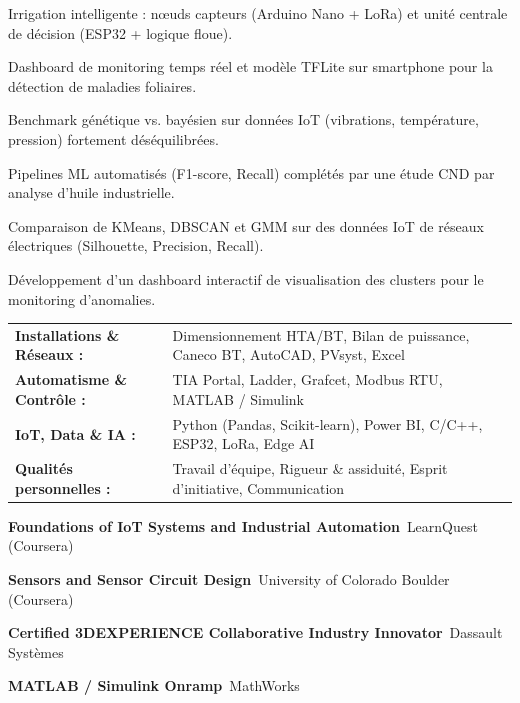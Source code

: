 \documentclass[10pt,a4paper]{../altacv}
\begin{document}
\begin{cvitems}
  \item Irrigation intelligente : nœuds capteurs (Arduino Nano + LoRa) et unité centrale de décision (ESP32 + logique floue).
  \item Dashboard de monitoring temps réel et modèle TFLite sur smartphone pour la détection de maladies foliaires.
\end{cvitems}
\vspace{2pt}
\begin{cvitems}
  \item Benchmark génétique vs. bayésien sur données IoT (vibrations, température, pression) fortement déséquilibrées.
  \item Pipelines ML automatisés (F1-score, Recall) complétés par une étude CND par analyse d’huile industrielle.
\end{cvitems}
\vspace{2pt}
\begin{cvitems}
  \item Comparaison de KMeans, DBSCAN et GMM sur des données IoT de réseaux électriques (Silhouette, Precision, Recall).
  \item Développement d’un dashboard interactif de visualisation des clusters pour le monitoring d’anomalies.
\end{cvitems}

{\small
\begin{tabular}{@{}ll@{}}
\textbf{Installations \& Réseaux :} & Dimensionnement HTA/BT, Bilan de puissance, Caneco BT, AutoCAD, PVsyst, Excel \\[1.5pt]
\textbf{Automatisme \& Contrôle :} & TIA Portal, Ladder, Grafcet, Modbus RTU, MATLAB / Simulink \\[1.5pt]
\textbf{IoT, Data \& IA :} & Python (Pandas, Scikit-learn), Power BI, C/C++, ESP32, LoRa, Edge AI \\[1.5pt]
\textbf{Qualités personnelles :} & Travail d’équipe, Rigueur \& assiduité, Esprit d’initiative, Communication
\end{tabular}
}

\begin{cvitems}
  \item \textbf{Foundations of IoT Systems and Industrial Automation}~\hfill {\color{emphasis}LearnQuest (Coursera)}
  \item \textbf{Sensors and Sensor Circuit Design}~\hfill {\color{emphasis}University of Colorado Boulder (Coursera)}
  \item \textbf{Certified 3DEXPERIENCE Collaborative Industry Innovator}~\hfill {\color{emphasis}Dassault Systèmes}
  \item \textbf{MATLAB / Simulink Onramp}~\hfill {\color{emphasis}MathWorks}
\end{cvitems}

\cvactivites
\cvlangues
\end{document}
